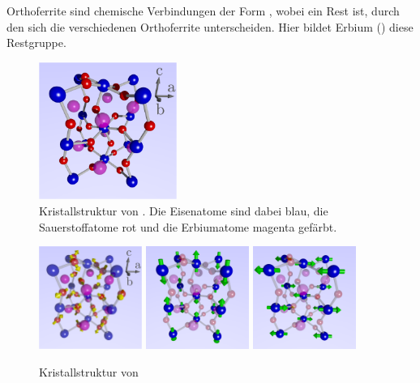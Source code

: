 \documentclass[main.tex]{subfiles}
\begin{document}
Orthoferrite sind chemische Verbindungen der Form , wobei  ein
Rest ist, durch den sich die verschiedenen Orthoferrite unterscheiden. Hier
bildet Erbium () diese Restgruppe.

\begin{figure}[H]
	\centering

	\includegraphics[width=0.4\textwidth]{bilder/jschlege/UnitCell_labeled.png}
	\caption{Kristallstruktur von
		. Die Eisenatome sind dabei blau, die
		Sauerstoffatome rot und die Erbiumatome magenta gefärbt.
		\cite{schlegel-master}}
	\label{fig:orthoferrit}
\end{figure}

\begin{figure}[H]
	\centering
	{\includegraphics[width=0.3\textwidth]{bilder/jschlege/UnitCell_withDMI_labeled.png}}
	{\includegraphics[width=0.3\textwidth]{bilder/jschlege/UnitCell_belowRT.png}}
	{\includegraphics[width=0.3\textwidth]{bilder/jschlege/UnitCell_aboveRT.png}}
	\caption{ Kristallstruktur von 
		\cite{schlegel-master}}
	\label{fig:orthoferrit2}
\end{figure}
\end{document}
